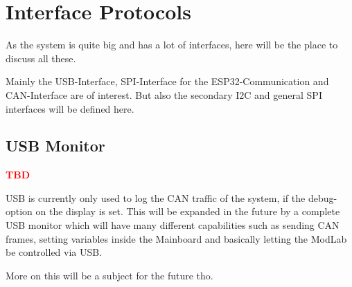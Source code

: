 \chapter{Interface Protocols}
As the system is quite big and has a lot of interfaces, here will be the place to discuss all these. 

Mainly the USB-Interface, SPI-Interface for the ESP32-Communication and CAN-Interface are of interest. But also the secondary I2C and general SPI interfaces will be defined here. 

\section{USB Monitor}
\textbf{\textcolor[HTML]{FF0000}{TBD}}

USB is currently only used to log the CAN traffic of the system, if the debug-option on the display is set. This will be expanded in the future by a complete USB monitor which will have many different capabilities such as sending CAN frames, setting variables inside the Mainboard and basically letting the ModLab be controlled via USB. 

More on this will be a subject for the future tho. 